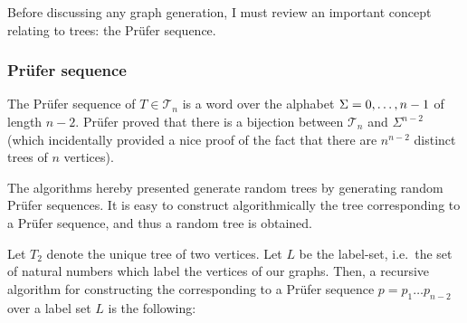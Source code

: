 \documentclass[
]{article}
\begin{document}
Before discussing any graph generation, I must review an important
concept relating to trees: the Prüfer sequence.

\hypertarget{pruxfcfer-sequence}{%
\subsubsection{Prüfer sequence}\label{pruxfcfer-sequence}}

The Prüfer sequence of \(T \in \mathcal{T}_n\) is a word over the
alphabet \(\Sigma = \\{0, \ldots, n - 1\\}\) of length \(n - 2\). Prüfer
proved that there is a bijection between \(\mathcal{T}_n\) and
\(\Sigma^{n-2}\) (which incidentally provided a nice proof of the fact
that there are \(n^{n-2}\) distinct trees of \(n\) vertices).

The algorithms hereby presented generate random trees by generating
random Prüfer sequences. It is easy to construct algorithmically the
tree corresponding to a Prüfer sequence, and thus a random tree is
obtained.

Let \(T_2\) denote the unique tree of two vertices. Let \(L\) be the
label-set, i.e.~the set of natural numbers which label the vertices of
our graphs. Then, a recursive algorithm for constructing the
corresponding to a Prüfer sequence \(p = p_1\ldots p_{n-2}\) over a
label set \(L\) is the following:
\end{document}
